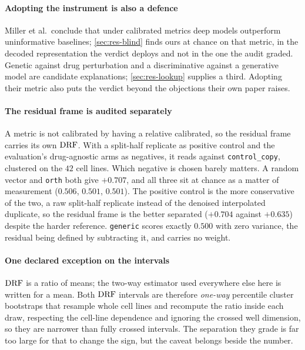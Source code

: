 \paragraph{Adopting the instrument is also a defence} Miller et al.\ conclude
that under calibrated metrics deep models outperform uninformative baselines;
\cref{sec:res-blind} finds ours at chance on that metric, in the decoded
representation the verdict deploys and not in the one the audit
graded.
Genetic against drug perturbation and a discriminative against a generative
model are candidate explanations; \cref{sec:res-lookup} supplies a third.
Adopting their metric also puts the verdict beyond the objections their own
paper raises.

\paragraph{The residual frame is audited separately} A metric is not calibrated
by having a relative calibrated, so the residual frame carries its own
$\textrm{DRF}$. With a split-half replicate as positive control and
the evaluation's drug-agnostic arms as negatives, it reads
 against \texttt{control\_copy}, clustered on the
$42$ cell lines. Which negative is chosen barely matters. A random vector and
\texttt{orth} both give $+0.707$, and all three sit at chance as a matter of
measurement ($0.506$, $0.501$, $0.501$). The positive control is the more
conservative of the two, a raw split-half replicate instead of the denoised
interpolated duplicate, so the residual frame is the better separated ($+0.704$
against $+0.635$) despite the harder reference. \texttt{generic} scores exactly
$0.500$ with zero variance, the residual being defined by subtracting it, and
carries no weight.

\paragraph{One declared exception on the intervals} $\textrm{DRF}$ is a ratio of means;
the two-way estimator used everywhere else here is written for a
mean. Both $\textrm{DRF}$ intervals are therefore
\emph{one-way} percentile cluster bootstraps that resample whole cell lines and
recompute the ratio inside each draw, respecting the cell-line dependence and
ignoring the crossed well dimension, so they are narrower than fully crossed
intervals. The separation they grade is far too large for that to change the
sign, but the caveat belongs beside the number.

